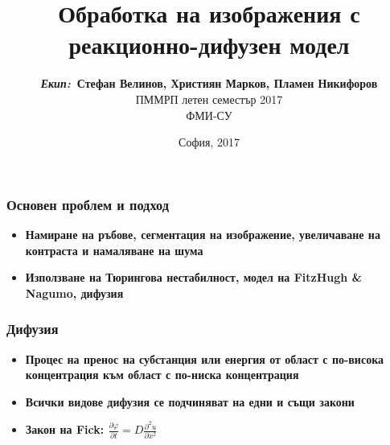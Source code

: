 \documentclass[14pt]{beamer}
\title{\textbf{Обработка на изображения с реакционно-дифузен модел}}
\author{\small{%
\textbf{\emph{Екип:}~Стефан Велинов, Християн Марков, Пламен Никифоров}}\\
\vspace{30pt}%
ПММРП летен семестър 2017\\
ФМИ-СУ%
\vspace{20pt}%
}
\date{\small{София, 2017}}
\begin{document}
\maketitle

\begin{frame}
\frametitle{Основен проблем и подход}
\begin{itemize}
  \item \textbf{Намиране на ръбове, сегментация на изображение, увеличаване на контраста и намаляване на шума}
  \item \textbf{Използване на Тюрингова нестабилност, модел на FitzHugh \& Nagumo, дифузия}
\end{itemize}
\end{frame}


\begin{frame}
\frametitle{Дифузия}
\begin{itemize}
  \item \textbf{Процес на пренос на субстанция или енергия от област с по-висока концентрация към област с по-ниска концентрация}
  \item \textbf{Всички видове дифузия се подчиняват на едни и същи закони}
  \item \textbf{Закон на Fick:  $ \frac{\partial \varphi}{\partial t} = D \frac{{\partial}^2 u}{\partial x^2} $}
\end{itemize}
\end{frame}

\end{document}
